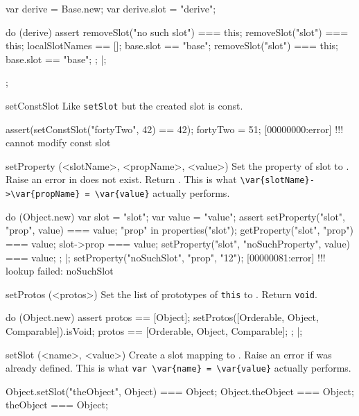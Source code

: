 \begin{urbiscriptapi}
\begin{urbiscript}
{  var derive = Base.new;
  var derive.slot = "derive";

  do (derive)
  {
    assert
    {
      removeSlot("no such slot") === this;
      removeSlot("slot") === this;
      localSlotNames == [];
      base.slot == "base";
      removeSlot("slot") === this;
      base.slot == "base";
    };
  }|;
};
\end{urbiscript}


\item[setConstSlot]
  Like \lstinline|setSlot| but the created slot is const.
\begin{urbiscript}
assert(setConstSlot("fortyTwo", 42) == 42);
fortyTwo = 51;
[00000000:error] !!! cannot modify const slot
\end{urbiscript}

\item[setProperty](<slotName>, <propName>, <value>)%
  Set the property  of slot  to
  .  Raise an error in  does not exist.
  Return .  This is what
  \lstinline|\var{slotName}->\var{propName} = \var{value}| actually
  performs.
\begin{urbiscript}
do (Object.new)
{
  var slot = "slot";
  var value = "value";
  assert
  {
    setProperty("slot", "prop", value) === value;
    "prop" in properties("slot");
    getProperty("slot", "prop") === value;
    slot->prop === value;
    setProperty("slot", "noSuchProperty", value) === value;
  };
}|;
setProperty("noSuchSlot", "prop", "12");
[00000081:error] !!! lookup failed: noSuchSlot
\end{urbiscript}


\item[setProtos](<protos>)%
  Set the list of prototypes of \lstinline|this| to .
  Return \lstinline|void|.
\begin{urbiscript}
do (Object.new)
{
  assert
  {
    protos == [Object];
    setProtos([Orderable, Object, Comparable]).isVoid;
    protos == [Orderable, Object, Comparable];
  };
}|;
\end{urbiscript}

\item[setSlot](<name>, <value>)%
  Create a slot  mapping to . Raise an error if
   was already defined.  This is what
  \lstinline|var \var{name} = \var{value}| actually performs.
\begin{urbiassert}
Object.setSlot("theObject", Object) === Object;
Object.theObject === Object;
theObject === Object;
\end{urbiassert}


\end{urbiscriptapi}
